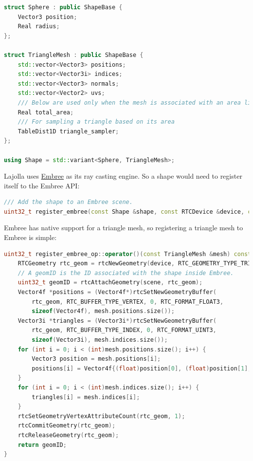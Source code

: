 \begin{lstlisting}[language=c++]
struct Sphere : public ShapeBase {
    Vector3 position;
    Real radius;
};

struct TriangleMesh : public ShapeBase {
    std::vector<Vector3> positions;
    std::vector<Vector3i> indices;
    std::vector<Vector3> normals;
    std::vector<Vector2> uvs;
    /// Below are used only when the mesh is associated with an area light
    Real total_area;
    /// For sampling a triangle based on its area
    TableDist1D triangle_sampler;
};

using Shape = std::variant<Sphere, TriangleMesh>;
\end{lstlisting}

Lajolla uses \href{https://www.embree.org/}{Embree} as its ray casting engine. So a shape would need to register itself to the Embree API:
\begin{lstlisting}[language=c++]
/// Add the shape to an Embree scene.
uint32_t register_embree(const Shape &shape, const RTCDevice &device, const RTCScene &scene);
\end{lstlisting}

Embree has native support for a triangle mesh, so registering a triangle mesh to Embree is simple:
\begin{lstlisting}[language=c++]
uint32_t register_embree_op::operator()(const TriangleMesh &mesh) const {
    RTCGeometry rtc_geom = rtcNewGeometry(device, RTC_GEOMETRY_TYPE_TRIANGLE);
    // A geomID is the ID associated with the shape inside Embree.
    uint32_t geomID = rtcAttachGeometry(scene, rtc_geom);
    Vector4f *positions = (Vector4f*)rtcSetNewGeometryBuffer(
        rtc_geom, RTC_BUFFER_TYPE_VERTEX, 0, RTC_FORMAT_FLOAT3,
        sizeof(Vector4f), mesh.positions.size());
    Vector3i *triangles = (Vector3i*)rtcSetNewGeometryBuffer(
        rtc_geom, RTC_BUFFER_TYPE_INDEX, 0, RTC_FORMAT_UINT3,
        sizeof(Vector3i), mesh.indices.size());
    for (int i = 0; i < (int)mesh.positions.size(); i++) {
        Vector3 position = mesh.positions[i];
        positions[i] = Vector4f{(float)position[0], (float)position[1], (float)position[2], 0.f};
    }
    for (int i = 0; i < (int)mesh.indices.size(); i++) {
        triangles[i] = mesh.indices[i];
    }
    rtcSetGeometryVertexAttributeCount(rtc_geom, 1);
    rtcCommitGeometry(rtc_geom);
    rtcReleaseGeometry(rtc_geom);
    return geomID;
}
\end{lstlisting}


